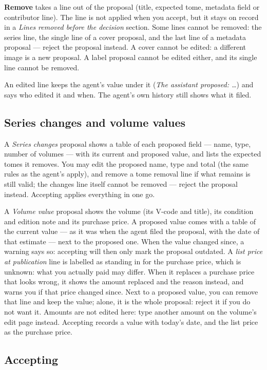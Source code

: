 \textbf{Remove} takes a line out of the proposal (title, expected
tome, metadata field or contributor line). The line is not applied
when you accept, but it stays on record in a \emph{Lines removed
before the decision} section. Some lines cannot be removed: the series
line, the single line of a cover proposal, and the last line of a
metadata proposal --- reject the proposal instead. A cover cannot be
edited: a different image is a new proposal. A label proposal cannot
be edited either, and its single line cannot be removed.

An edited line keeps the agent's value under it (\emph{The assistant
proposed: \dots}) and says who edited it and when. The agent's own
history still shows what it filed.

\subsection{Series changes and volume values}
\label{sec:proposals-series-value}

A \emph{Series changes} proposal shows a table of each proposed field
--- name, type, number of volumes --- with its current and proposed
value, and lists the expected tomes it removes. You may edit the
proposed name, type and total (the same rules as the agent's apply),
and remove a tome removal line if what remains is still valid; the
changes line itself cannot be removed --- reject the proposal instead.
Accepting applies everything in one go.

A \emph{Volume value} proposal shows the volume (its V-code and
title), its condition and edition note and its purchase price. A
proposed value comes with a table of the current value --- as it was
when the agent filed the proposal, with the date of that estimate ---
next to the proposed one. When the value changed since, a warning says
so: accepting will then only mark the proposal outdated. A \emph{list
price at publication} line is labelled as standing in for the purchase
price, which is unknown: what you actually paid may differ. When it
replaces a purchase price that looks wrong, it shows the amount
replaced and the reason instead, and warns you if that price changed
since. Next to a proposed value, you can remove that line and keep the
value; alone, it is the whole proposal: reject it if you do not want
it. Amounts are not edited here: type another amount on the volume's
edit page instead. Accepting records a value with today's date, and
the list price as the purchase price.

\subsection{Accepting}

